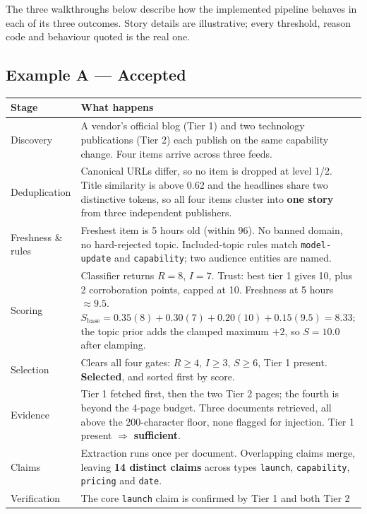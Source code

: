 \documentclass[11pt,a4paper]{article}
\newcommand{\brk}{\hyphenpenalty=0\exhyphenpenalty=0\relax}
\newcommand{\code}[1]{\texttt{\small\brk #1}}
\begin{document}
The three walkthroughs below describe how the implemented pipeline behaves in
each of its three outcomes. Story details are illustrative; every threshold,
reason code and behaviour quoted is the real one.

\subsection{Example A --- Accepted}

\begin{center}
\small
\begin{tabularx}{\textwidth}{@{}p{3.9cm} >{\RaggedRight}X@{}}
\toprule
\textbf{Stage} & \textbf{What happens} \\
\midrule
Discovery & A vendor's official blog (Tier 1) and two technology publications
  (Tier 2) each publish on the same capability change. Four items arrive across
  three feeds. \\
Deduplication & Canonical URLs differ, so no item is dropped at level 1/2. Title
  similarity is above 0.62 and the headlines share two distinctive tokens, so all
  four items cluster into \textbf{one story} from three independent publishers. \\
Freshness \& rules & Freshest item is 5 hours old (within 96). No banned domain, no
  hard-rejected topic. Included-topic rules match \code{model-update} and
  \code{capability}; two audience entities are named. \\
Scoring & Classifier returns $R=8$, $I=7$. Trust: best tier 1 gives 10, plus 2
  corroboration points, capped at 10. Freshness at 5 hours $\approx 9.5$.
  $S_{\text{base}} = 0.35(8)+0.30(7)+0.20(10)+0.15(9.5) = 8.33$; the topic prior
  adds the clamped maximum $+2$, so $S = 10.0$ after clamping. \\
Selection & Clears all four gates: $R \geq 4$, $I \geq 3$, $S \geq 6$, Tier 1
  present. \textcolor{aitkGo}{\textbf{Selected}}, and sorted first by score. \\
Evidence & Tier 1 fetched first, then the two Tier 2 pages; the fourth is beyond
  the 4-page budget. Three documents retrieved, all above the 200-character floor,
  none flagged for injection. Tier 1 present $\Rightarrow$ \textbf{sufficient}. \\
Claims & Extraction runs once per document. Overlapping claims merge, leaving
  \textbf{14 distinct claims} across types \code{launch}, \code{capability},
  \code{pricing} and \code{date}. \\
Verification & The core \code{launch} claim is confirmed by Tier 1 and both Tier 2

\end{tabularx}
\end{center}
\end{document}
